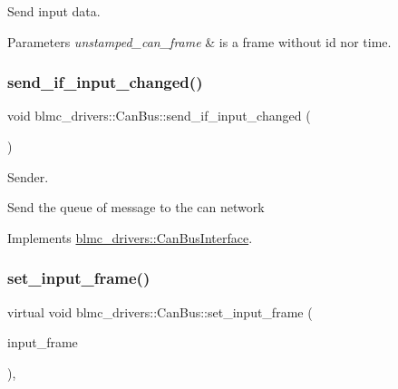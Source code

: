 Send input data. 


\begin{DoxyParams}{Parameters}
{\em unstamped\+\_\+can\+\_\+frame} & is a frame without id nor time. \\
\hline
\end{DoxyParams}
\mbox{\label{classblmc__drivers_1_1CanBus_acf90b96ca5727f9ecb328ce20d7a2cbc}} 
\subsubsection{\texorpdfstring{send\+\_\+if\+\_\+input\+\_\+changed()}{send\_if\_input\_changed()}}
{\footnotesize\ttfamily void blmc\+\_\+drivers\+::\+Can\+Bus\+::send\+\_\+if\+\_\+input\+\_\+changed (\begin{DoxyParamCaption}{ }\end{DoxyParamCaption})\hspace{0.3cm}{\ttfamily [virtual]}}



Sender. 

Send the queue of message to the can network 

Implements \hyperlink{classblmc__drivers_1_1CanBusInterface_aa97ce2a204aa8354b8ea62af5f3820a2}{blmc\+\_\+drivers\+::\+Can\+Bus\+Interface}.

\mbox{\label{classblmc__drivers_1_1CanBus_ae4887644960c0a92fc82f8bdffbe9c48}} 
\subsubsection{\texorpdfstring{set\+\_\+input\+\_\+frame()}{set\_input\_frame()}}
{\footnotesize\ttfamily virtual void blmc\+\_\+drivers\+::\+Can\+Bus\+::set\+\_\+input\+\_\+frame (\begin{DoxyParamCaption}\item[{const \hyperlink{classblmc__drivers_1_1CanBusFrame}{Can\+Bus\+Frame} \&}]{input\+\_\+frame }\end{DoxyParamCaption})\hspace{0.3cm}{\ttfamily [inline]}, {\ttfamily [virtual]}}



